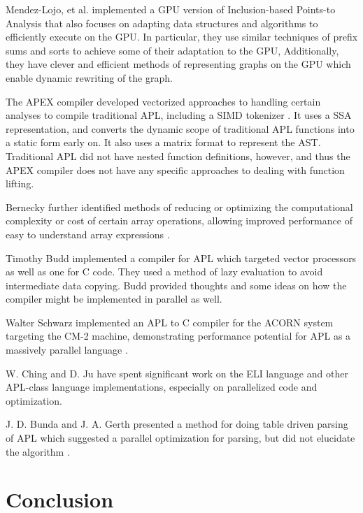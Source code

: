 \documentclass[numbers,preprint]{sigplanconf}
\begin{document}
Mendez-Lojo, et al. implemented a GPU version of Inclusion-based
Points-to Analysis \cite{mendez2012inclusion} that also focuses on 
adapting data structures
and algorithms to efficiently execute on the GPU. In particular,
they use similar techniques of prefix sums and sorts to achieve some
of their adaptation to the GPU, Additionally, they have clever and
efficient methods of representing graphs on the GPU which enable
dynamic rewriting of the graph.

The APEX compiler \cite{bernecky1997apex} developed vectorized approaches to handling
certain analyses to compile traditional APL, including a SIMD tokenizer
\cite{bernecky2003tokenizer}.
 It uses a SSA representation, and converts the dynamic scope of
traditional APL functions into a static form early on. It also uses
a matrix format to represent the AST. Traditional APL did not have
nested function definitions, however, and thus the APEX compiler does
not have any specific approaches to dealing with function lifting.

Bernecky further identified methods of reducing or optimizing the
computational complexity or cost of certain array operations, allowing
improved performance of easy to understand array expressions
\cite{bernecky1999reducing}.

Timothy Budd implemented a compiler \cite{budd1984apl,budd2012apl} for APL which targeted
vector processors as well as one for C code. They used a method of
lazy evaluation to avoid intermediate data copying. Budd provided
thoughts and some ideas on how the compiler might be implemented in
parallel as well.

Walter Schwarz implemented an APL to C compiler for the ACORN system
targeting the CM-2 machine, demonstrating performance potential for
APL as a massively parallel language \cite{schwarz1991acorn}.

W. Ching and D. Ju have spent significant work on the ELI language
and other APL-class language
 implementations, especially on parallelized code and optimization. 
\cite{ching2000design,ching1994experimental,ching1993primitive,
ching1990automatic,hendriks1990sparse,ju1991exploitation,
ju1991performance}

J. D. Bunda and J. A. Gerth presented a method for doing table driven
parsing of APL which suggested a parallel optimization for parsing,
but did not elucidate the algorithm \cite{bunda1984apl}.

\section{Conclusion}
\end{document}
